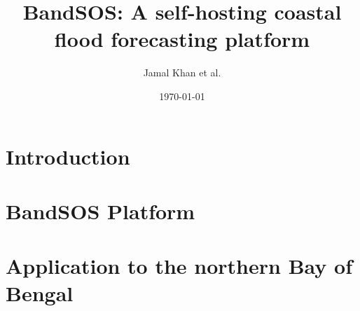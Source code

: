 \documentclass{article}
\author{Jamal Khan et al.}
\date{\today}
\title{BandSOS: A self-hosting coastal flood forecasting platform}
\begin{document}
\maketitle
\tableofcontents


\section{Introduction}
\label{sec:org4808945}
\section{BandSOS Platform}
\label{sec:orgf93316c}
\section{Application to the northern Bay of Bengal}
\label{sec:orge05512b}
\end{document}
